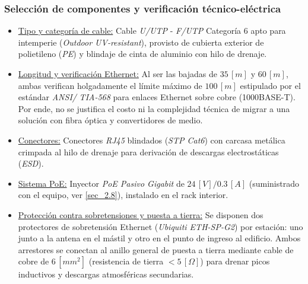 \subsubsection{Selección de componentes y verificación técnico-eléctrica}
\begin{itemize}
    \item \underline{Tipo y categoría de cable:} Cable \textit{U/UTP} - \textit{F/UTP} Categoría $6$ apto para intemperie (\textit{Outdoor UV-resistant}), provisto de cubierta exterior de polietileno (\textit{PE}) y blindaje de cinta de aluminio con hilo de drenaje.
    \item \underline{Longitud y verificación Ethernet:} Al ser las bajadas de $35 \, [m]$ y $60 \, [m]$, ambas verifican holgadamente el límite máximo de $100 \, [m]$ estipulado por el estándar \textit{ANSI/} \textit{TIA-568} para enlaces Ethernet sobre cobre (1000BASE-T). Por ende, no se justifica el costo ni la complejidad técnica de migrar a una solución con fibra óptica y convertidores de medio.
    \item \underline{Conectores:} Conectores \textit{RJ45} blindados (\textit{STP Cat6}) con carcasa metálica crimpada al hilo de drenaje para derivación de descargas electrostáticas (\textit{ESD}).
    \item \underline{Sistema PoE:} Inyector \textit{PoE Pasivo Gigabit} de $24 \, [V] / 0.3 \, [A]$ (suministrado con el equipo, ver \autoref{sec_2.8}), instalado en el rack interior.
    \item \underline{Protección contra sobretensiones y puesta a tierra:} Se disponen dos protectores de sobretensión Ethernet (\textit{Ubiquiti ETH-SP-G2}) por estación: uno junto a la antena en el mástil y otro en el punto de ingreso al edificio. Ambos arrestores se conectan al anillo general de puesta a tierra mediante cable de cobre de $6 \, [mm^2]$ (resistencia de tierra $< 5 \, [\Omega]$) para drenar picos inductivos y descargas atmosféricas secundarias.
\end{itemize}



